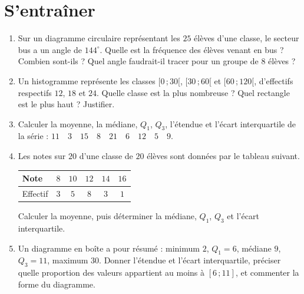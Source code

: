 
\section*{S'entraîner}

\begin{enumerate}
  \item Sur un diagramme circulaire représentant les $25$ élèves d'une classe, le
    secteur \og bus \fg{} a un angle de $144^\circ$. Quelle est la fréquence des
    élèves venant en bus ? Combien sont-ils ? Quel angle faudrait-il tracer pour un
    groupe de $8$ élèves ?

  \item Un histogramme représente les classes $[0\,;30[$, $[30\,;60[$ et
    $[60\,;120[$, d'effectifs respectifs $12$, $18$ et $24$. Quelle classe est la
    plus nombreuse ? Quel rectangle est le plus haut ? Justifier.

  \item Calculer la moyenne, la médiane, $Q_1$, $Q_3$, l'étendue et l'écart
    interquartile de la série :
    $11 \quad 3 \quad 15 \quad 8 \quad 21 \quad 6 \quad 12 \quad 5 \quad 9$.

  \item Les notes sur $20$ d'une classe de $20$ élèves sont données par le tableau
    suivant.
    \begin{center}
    \renewcommand{\arraystretch}{1.3}
    \begin{tabular}{lccccc}
    \toprule
    Note     & $8$ & $10$ & $12$ & $14$ & $16$ \\
    \midrule
    Effectif & $3$ & $5$  & $8$  & $3$  & $1$ \\
    \bottomrule
    \end{tabular}
    \end{center}
    Calculer la moyenne, puis déterminer la médiane, $Q_1$, $Q_3$ et l'écart
    interquartile.

  \item Un diagramme en boîte a pour résumé : minimum $2$, $Q_1 = 6$,
    médiane $9$, $Q_3 = 11$, maximum $30$. Donner l'étendue et l'écart
    interquartile, préciser quelle proportion des valeurs appartient au moins à
    $[6\,;11]$, et commenter la forme du diagramme.


\end{enumerate}

